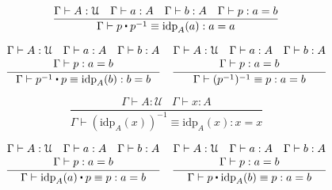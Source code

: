 \documentclass[a4paper,UKenglish,cleveref, autoref, thm-restate]{lipics-v2021}
\newcommand{\UU}{\ensuremath{\mathcal{U}}}
\newcommand{\ct}{%
  \mathchoice{\mathbin{\raisebox{0.5ex}{$\displaystyle\centerdot$}}}%
             {\mathbin{\raisebox{0.5ex}{$\centerdot$}}}%
             {\mathbin{\raisebox{0.25ex}{$\scriptstyle\,\centerdot\,$}}}%
             {\mathbin{\raisebox{0.1ex}{$\scriptscriptstyle\,\centerdot\,$}}}
}
\begin{document}
\begin{equation*}
    \frac{\Gamma \vdash A : \UU \hspace{10pt} \Gamma \vdash a : A \hspace{10pt} \Gamma \vdash b : A \hspace{10pt} \Gamma \vdash p : a = b}
         {\Gamma \vdash p \ct p^{-1} \equiv \mathrm{idp}_A(a) : a = a}
\end{equation*}

\begin{equation*}
    \frac{\begin{matrix}
            \Gamma \vdash A : \UU \hspace{10pt} \Gamma \vdash a : A \hspace{10pt} \Gamma \vdash b : A \\
            \Gamma \vdash p : a = b
          \end{matrix}}
         {\Gamma \vdash p^{-1} \ct p \equiv \mathrm{idp}_A(b) : b = b}
    \quad
    \frac{\begin{matrix}
            \Gamma \vdash A : \UU \hspace{10pt} \Gamma \vdash a : A \hspace{10pt} \Gamma \vdash b : A \\
            \Gamma \vdash p : a = b
          \end{matrix}}
         {\Gamma \vdash (p^{-1})^{-1} \equiv p : a = b}
\end{equation*}

\begin{equation*}
    \frac{\Gamma \vdash A : \UU \hspace{10pt} \Gamma \vdash x : A}
         {\Gamma \vdash (\mathrm{idp}_A(x))^{-1} \equiv \mathrm{idp}_A(x) : x = x}
\end{equation*}

\begin{equation*}
    \frac{\begin{matrix}
            \Gamma \vdash A : \UU \hspace{10pt} \Gamma \vdash a : A \hspace{10pt} \Gamma \vdash b : A \\
            \Gamma \vdash p : a = b
          \end{matrix}}
         {\Gamma \vdash \mathrm{idp}_A(a) \ct p \equiv p : a = b}
    \quad
    \frac{\begin{matrix}
            \Gamma \vdash A : \UU \hspace{10pt} \Gamma \vdash a : A \hspace{10pt} \Gamma \vdash b : A \\
            \Gamma \vdash p : a = b
          \end{matrix}}
         {\Gamma \vdash p \ct \mathrm{idp}_A(b) \equiv p : a = b}
\end{equation*}
\end{document}
